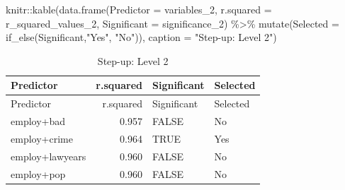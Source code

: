 \documentclass[
  10pt,
]{article}
\newenvironment{Shaded}{\begin{snugshade}}{\end{snugshade}}
\newcommand{\AttributeTok}[1]{\textcolor[rgb]{0.77,0.63,0.00}{#1}}
\newcommand{\FunctionTok}[1]{\textcolor[rgb]{0.00,0.00,0.00}{#1}}
\newcommand{\NormalTok}[1]{#1}
\newcommand{\SpecialCharTok}[1]{\textcolor[rgb]{0.00,0.00,0.00}{#1}}
\newcommand{\StringTok}[1]{\textcolor[rgb]{0.31,0.60,0.02}{#1}}
\begin{document}
\begin{Shaded}
\begin{Highlighting}[]
\NormalTok{knitr}\SpecialCharTok{::}\FunctionTok{kable}\NormalTok{(}\FunctionTok{data.frame}\NormalTok{(}\AttributeTok{Predictor =}\NormalTok{ variables\_2, }\AttributeTok{r.squared =}\NormalTok{ r\_squared\_values\_2, }
  \AttributeTok{Significant =}\NormalTok{ significance\_2) }\SpecialCharTok{\%\textgreater{}\%} \FunctionTok{mutate}\NormalTok{(}\AttributeTok{Selected =} \FunctionTok{if\_else}\NormalTok{(Significant,}\StringTok{"Yes"}\NormalTok{, }\StringTok{"No"}\NormalTok{)), }
  \AttributeTok{caption =} \StringTok{"Step{-}up: Level 2"}\NormalTok{)}
\end{Highlighting}
\end{Shaded}

\begin{longtable}[]{@{}lrll@{}}
\caption{Step-up: Level 2}\tabularnewline
\toprule
Predictor & r.squared & Significant & Selected\tabularnewline
\midrule
\endfirsthead
\toprule
Predictor & r.squared & Significant & Selected\tabularnewline
\midrule
\endhead
employ+bad & 0.957 & FALSE & No\tabularnewline
employ+crime & 0.964 & TRUE & Yes\tabularnewline
employ+lawyears & 0.960 & FALSE & No\tabularnewline
employ+pop & 0.960 & FALSE & No\tabularnewline
\bottomrule
\end{longtable}
\end{document}

